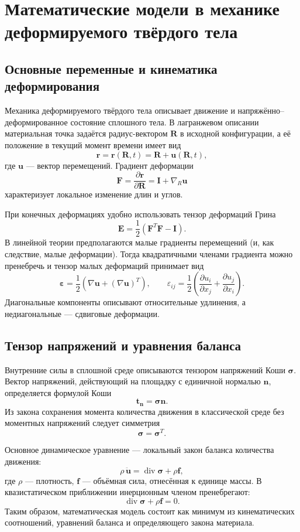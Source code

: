 \section{Математические модели в механике деформируемого твёрдого тела}
\label{sec:solid-mechanics-models}

\subsection{Основные переменные и кинематика деформирования}

Механика деформируемого твёрдого тела описывает движение и напряжённо--
деформированное состояние сплошного тела. В лагранжевом описании материальная
точка задаётся радиус-вектором $\mathbf R$ в исходной конфигурации, а её положение
в текущий момент времени имеет вид
\[
    \mathbf r=\mathbf r(\mathbf R,t)
    =\mathbf R+\mathbf u(\mathbf R,t),
\]
где $\mathbf u$ --- вектор перемещений. Градиент деформации
\[
    \mathbf F=\frac{\partial \mathbf r}{\partial \mathbf R}
    =\mathbf I+\nabla_{\!R}\mathbf u
\]
характеризует локальное изменение длин и углов.

При конечных деформациях удобно использовать тензор деформаций Грина
\[
    \mathbf E=\frac12\left(\mathbf F^{T}\mathbf F-\mathbf I\right).
\]
В линейной теории предполагаются малые градиенты перемещений (и, как следствие,
малые деформации). Тогда квадратичными членами градиента можно пренебречь и тензор
малых деформаций принимает вид
\[
    \boldsymbol\varepsilon
    =\frac12\left(\nabla\mathbf u+(\nabla\mathbf u)^T\right),
    \qquad
    \varepsilon_{ij}=\frac12
    \left(\frac{\partial u_i}{\partial x_j}
          +\frac{\partial u_j}{\partial x_i}\right).
\]
Диагональные компоненты описывают относительные удлинения, а недиагональные
--- сдвиговые деформации.

\subsection{Тензор напряжений и уравнения баланса}

Внутренние силы в сплошной среде описываются тензором напряжений Коши
$\boldsymbol\sigma$. Вектор напряжений, действующий на площадку с единичной
нормалью $\mathbf n$, определяется формулой Коши
\[
    \mathbf t_{\mathbf n}=\boldsymbol\sigma\mathbf n.
\]
Из закона сохранения момента количества движения в классической среде без
моментных напряжений следует симметрия
\[
    \boldsymbol\sigma=\boldsymbol\sigma^T.
\]

Основное динамическое уравнение --- локальный закон баланса количества
движения:
\[
    \rho\,\ddot{\mathbf u}
    =\operatorname{div}\boldsymbol\sigma+\rho\mathbf f,
\]
где $\rho$ --- плотность, $\mathbf f$ --- объёмная сила, отнесённая к единице
массы. В квазистатическом приближении инерционным членом пренебрегают:
\[
    \operatorname{div}\boldsymbol\sigma+\rho\mathbf f=0.
\]
Таким образом, математическая модель состоит как минимум из кинематических
соотношений, уравнений баланса и определяющего закона материала.

